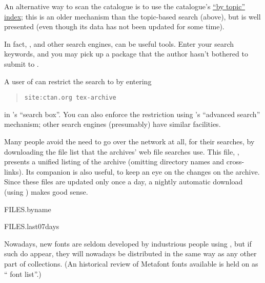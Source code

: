 

An alternative way to scan the catalogue is to use the catalogue's
\href{http://mirrors.ctan.org/help/Catalogue/bytopic.html}{``by topic'' index};
this is an older mechanism than the topic-based search (above), but is
well presented (even though its data has not been updated for some time).  

In fact, , and other search engines, can be useful
tools.  Enter your search keywords, and you may pick up a package that
the author hasn't bothered to submit to .

A user of  can restrict the search to
 by entering
\begin{quote}
  \texttt{site:ctan.org tex-archive }
\end{quote}
in 's ``search box''.  You can also enforce the
restriction using 's ``advanced search'' mechanism;
other search engines (presumably) have similar facilities.

Many people avoid the need to go over the network at all, for their
searches, by downloading the file list that the archives' web
file searches use.  This file, ,
presents a unified listing of the archive (omitting directory names and
cross-links).  Its companion  is also useful, to
keep an eye on the changes on the archive.  Since these files are
updated only once a day, a nightly automatic download (using
) makes good sense.
\begin{ctanrefs}
\item[FILES.byname]
\item[FILES.last07days]
\end{ctanrefs}


Nowadays, new fonts are seldom developed by industrious people using
\mf{}, but if such do appear, they will nowadays be distributed in
the same way as any other part of \alltex{} collections.  (An
historical review of Metafont fonts available is held on 
as ``\mf{} font list''.)

